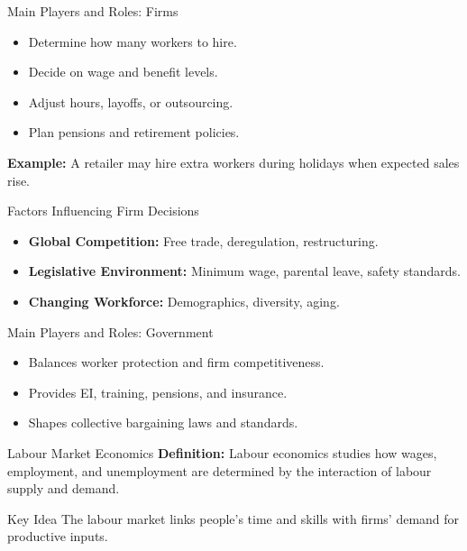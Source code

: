 \documentclass[aspectratio=169]{beamer}
\begin{document}
\begin{frame}{Main Players and Roles: Firms}
\begin{itemize}[<+->]
  \item Determine how many workers to hire.
  \item Decide on wage and benefit levels.
  \item Adjust hours, layoffs, or outsourcing.
  \item Plan pensions and retirement policies.
\end{itemize}
\textbf{Example:} A retailer may hire extra workers during holidays when expected sales rise.
\end{frame}

\begin{frame}{Factors Influencing Firm Decisions}
\begin{itemize}[<+->]
  \item \textbf{Global Competition:} Free trade, deregulation, restructuring.
  \item \textbf{Legislative Environment:} Minimum wage, parental leave, safety standards.
  \item \textbf{Changing Workforce:} Demographics, diversity, aging.
\end{itemize}
\end{frame}

\begin{frame}{Main Players and Roles: Government}
\begin{itemize}[<+->]
  \item Balances worker protection and firm competitiveness.
  \item Provides EI, training, pensions, and insurance.
  \item Shapes collective bargaining laws and standards.
\end{itemize}
\end{frame}

\begin{frame}{Labour Market Economics}
\textbf{Definition:} Labour economics studies how wages, employment, and unemployment are determined by the interaction of labour supply and demand.
\begin{block}{Key Idea}
The labour market links people’s time and skills with firms’ demand for productive inputs.
\end{block}
\end{frame}
\end{document}
